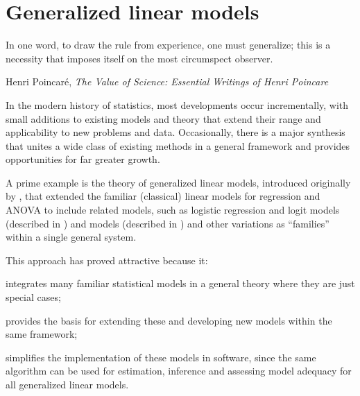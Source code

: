 \documentclass[11pt]{book}\usepackage[]{graphicx}\usepackage[]{color}
\begin{document}





\chapter{Generalized linear models}\label{ch:glm}


\epigraph{In one word, to draw the rule from experience, one must generalize; this is a necessity that imposes itself on the most circumspect observer.}
{Henri Poincar\'e, \emph{The Value of Science: Essential Writings of Henri Poincare}}

In the modern history of statistics, most developments occur incrementally, with
small additions to existing models and theory that extend their range
and applicability to new problems and data.  Occasionally, there is
a major synthesis that unites a wide class of existing methods in a
general framework and provides opportunities for far greater growth.

A prime example is the theory of generalized linear models, introduced
originally by \citet{NelderWedderburn:72}, that extended the familiar
(classical) linear models for regression and ANOVA to include related
models, such as logistic regression and logit models (described in )
and \loglin models (described in )
and other variations as ``families'' within a single general system.

This approach has proved attractive because it:
\begin{seriate}
 \item integrates many familiar statistical models in a general theory where they are
 just special cases;
 \item provides the basis for extending these and developing new models within the
 same framework;
 \item simplifies the implementation of these models in software, since the same
 algorithm can be used for estimation, inference and assessing model adequacy
 for all generalized linear models.
\end{seriate}
\end{document}
